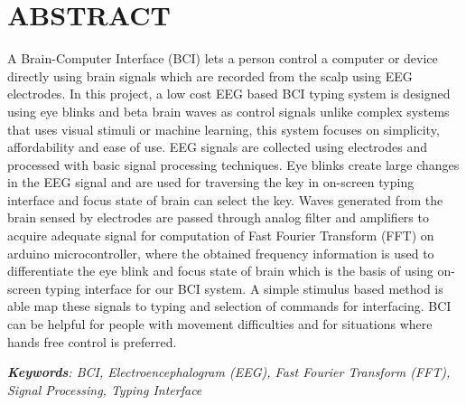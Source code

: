 

\chapter*{ABSTRACT}
{}


\bigskip

A Brain-Computer Interface (BCI) lets a person control a computer or device directly using brain signals which are recorded from the scalp using EEG electrodes. In this project, a low cost EEG based BCI typing system is designed using eye blinks and beta brain waves as control signals unlike complex systems that uses visual stimuli or machine learning, this system focuses on simplicity, affordability and ease of use. EEG signals are collected using electrodes and processed with basic signal processing techniques. Eye blinks create large changes in the EEG signal and are used for traversing the key in on-screen typing interface and focus state of brain can select the key. Waves generated from the brain sensed by electrodes are passed through analog filter and amplifiers to acquire adequate signal for computation of Fast Fourier Transform (FFT) on arduino microcontroller, where the obtained frequency information is used to differentiate the eye blink and focus state of brain which is the basis of using on-screen typing interface for our BCI system. A simple stimulus based method is able map these signals to typing and selection of commands  for interfacing. BCI can be helpful for people with movement difficulties and for situations where hands free control is preferred.


\vspace{1em}
\noindent\textit{\textbf{Keywords}: BCI, Electroencephalogram (EEG), Fast Fourier Transform (FFT), Signal Processing, Typing Interface}
